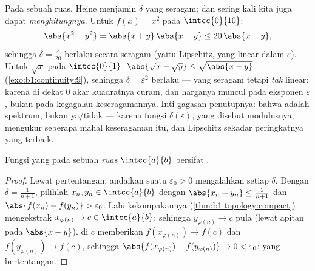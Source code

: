 \begin{example}\label{ex:b1:continuity:moduli}
Pada sebuah ruas, Heine menjamin $\delta$ yang seragam; dan sering kali kita
juga dapat \emph{menghitungnya}. Untuk $f(x) = x^2$ pada $\intcc{0}{10}$:
\[
\abs{x^2 - y^2} = \abs{x + y}\,\abs{x - y} \leq 20\,\abs{x - y},
\]
sehingga $\delta = \frac{\varepsilon}{20}$ berlaku secara seragam (yaitu
 Lipschitz, yang linear dalam $\varepsilon$). Untuk $\sqrt x$ pada
$\intcc{0}{1}$: $\abs{\sqrt x - \sqrt y} \leq \sqrt{\abs{x -
y}}$ (\cref{exo:b1:continuity:9}), sehingga $\delta = \varepsilon^2$
berlaku --- yang seragam tetapi \emph{tak} linear: karena di dekat $0$ akar
kuadratnya curam, dan harganya muncul pada eksponen
$\varepsilon$, bukan pada kegagalan keseragamannya. Inti gagasan
penutupnya: bahwa  adalah spektrum, bukan ya/tidak ---
karena fungsi $\delta(\varepsilon)$, yang disebut modulusnya, mengukur
seberapa mahal keseragaman itu, dan Lipschitz sekadar peringkatnya
yang terbaik.
\end{example}

\begin{theorem}[Heine]\label{thm:b1:continuity:heine}
Fungsi yang  pada sebuah \emph{ruas} $\intcc{a}{b}$ bersifat .
\end{theorem}

\begin{proof}
Lewat pertentangan: andaikan suatu $\varepsilon_0 > 0$ mengalahkan setiap
$\delta$. Dengan $\delta = \frac{1}{n+1}$, pilihlah $x_n, y_n \in
\intcc{a}{b}$ dengan $\abs{x_n - y_n} \leq \frac{1}{n+1}$ dan
$\abs{f(x_n) - f(y_n)} > \varepsilon_0$. Lalu kekompakannya
(\cref{thm:b1:topology:compact}) mengekstrak $x_{\varphi(n)} \to c \in
\intcc{a}{b}$; sehingga $y_{\varphi(n)} \to c$ pula (lewat apitan pada $\abs{x -
y}$).  di $c$ memberikan $f(x_{\varphi(n)}) \to f(c)$ dan
$f(y_{\varphi(n)}) \to f(c)$, sehingga $\abs{f(x_{\varphi(n)}) -
f(y_{\varphi(n)})} \to 0 < \varepsilon_0$: yang bertentangan.
\end{proof}


